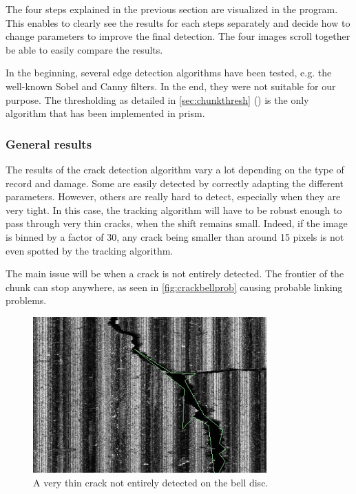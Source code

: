 The four steps explained in the previous section are visualized in the program. This enables to clearly see the results for each steps separately and decide how to change parameters to improve the final detection. The four images scroll together be able to easily compare the results.

In the beginning, several edge detection algorithms have been tested, e.g. the well-known Sobel and Canny filters. In the end, they were not suitable for our purpose. The thresholding as detailed in \autoref{sec:chunkthresh} () is the only algorithm that has been implemented in \gls{prism}.

\subsubsection{General results}

The results of the crack detection algorithm vary a lot depending on the type of record and damage. Some are easily detected by correctly adapting the different parameters. However, others are really hard to detect, especially when they are very tight. In this case, the tracking algorithm will have to be robust enough to pass through very thin cracks, when the shift remains small. Indeed, if the image is binned by a factor of 30, any crack being smaller than around 15 pixels is not even spotted by the tracking algorithm.

The main issue will be when a crack is not entirely detected. The frontier of the chunk can stop anywhere, as seen in \autoref{fig:crackbellprob} causing probable linking problems.

\begin{figure}[!ht]
\centering
\includegraphics[width=0.8\textwidth]{images/crack-bell-prob}
\caption{A very thin crack not entirely detected on the bell disc.}
\label{fig:crackbellprob}
\end{figure}

